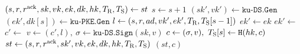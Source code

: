 \algrenewcommand\textproc{}
\algrenewcommand{}

\begin{minipage}{1\linewidth}
  {\fontsize{8}{10}\selectfont
  \begin{algorithmic}[1]
    \State $(s,r,r^\text{ack},sk,vk,ek,dk,hk,T_\text{R},T_\text{S}) \gets st$
    \State $s \gets s+1$
    \State $(sk',vk') \gets \texttt{ku-DS.Gen}$
    \State $(ek',dk[s]) \gets \texttt{ku-PKE.Gen}$
    \State $l \gets (s,r,ad,vk',ek',T_\text{R},T_\text{S}[s-1])$
    \State $ek' \gets ek$
    \State $ek' \gets$ 
    \EndFor
    \State $c' \gets$ 
    \State $v \gets (c',l), \ \sigma \gets \texttt{ku-DS.Sign}(sk,v)$
    \State $c \gets (\sigma,v), \ T_\text{S}[s] \gets \texttt{H}(hk,c)$
    \State $st \gets (s,r,r^\text{ack},sk',vk,ek,dk,hk,T_\text{R},T_\text{S})$
    \State \Return $(st,c)$
    \EndProcedure
  \end{algorithmic}
  }
\end{minipage}
